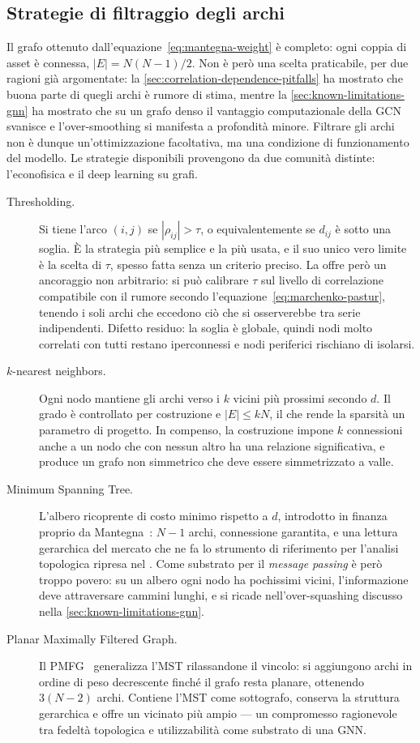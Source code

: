 \subsection{Strategie di filtraggio degli archi}

Il grafo ottenuto dall'equazione~\eqref{eq:mantegna-weight} è completo: ogni coppia di asset è connessa, $|E| = N(N-1)/2$. Non è però una scelta praticabile, per due ragioni già argomentate: la \cref{sec:correlation-dependence-pitfalls} ha mostrato che buona parte di quegli archi è rumore di stima, mentre la \cref{sec:known-limitations-gnn} ha mostrato che su un grafo denso il vantaggio computazionale della GCN svanisce e l'over-smoothing si manifesta a profondità minore. Filtrare gli archi non è dunque un'ottimizzazione facoltativa, ma una condizione di funzionamento del modello. Le strategie disponibili provengono da due comunità distinte: l'econofisica e il deep learning su grafi.

\begin{description}
    \item[Thresholding.] Si tiene l'arco $(i,j)$ se $|\rho_{ij}|>\tau$, o equivalentemente se $d_{ij}$ è sotto una soglia. È la strategia più semplice e la più usata, e il suo unico vero limite è la scelta di $\tau$, spesso fatta senza un criterio preciso. La  offre però un ancoraggio non arbitrario: si può calibrare $\tau$ sul livello di correlazione compatibile con il rumore secondo l'equazione~\eqref{eq:marchenko-pastur}, tenendo i soli archi che eccedono ciò che si osserverebbe tra serie indipendenti. Difetto residuo: la soglia è globale, quindi nodi molto correlati con tutti restano iperconnessi e nodi periferici rischiano di isolarsi.
    \item[$k$-nearest neighbors.] Ogni nodo mantiene gli archi verso i $k$ vicini più prossimi secondo $d$. Il grado è controllato per costruzione e $|E|\leq kN$, il che rende la sparsità un parametro di progetto. In compenso, la costruzione impone $k$ connessioni anche a un nodo che con nessun altro ha una relazione significativa, e produce un grafo non simmetrico che deve essere simmetrizzato a valle.
    \item[Minimum Spanning Tree.] L'albero ricoprente di costo minimo rispetto a $d$, introdotto in finanza proprio da Mantegna~\cite{mantegna1999hierarchical}: $N-1$ archi, connessione garantita, e una lettura gerarchica del mercato che ne fa lo strumento di riferimento per l'analisi topologica ripresa nel . Come substrato per il \emph{message passing} è però troppo povero: su un albero ogni nodo ha pochissimi vicini, l'informazione deve attraversare cammini lunghi, e si ricade nell'over-squashing discusso nella \cref{sec:known-limitations-gnn}.
    \item[Planar Maximally Filtered Graph.] Il PMFG~\cite{tumminello2005tool} generalizza l'MST rilassandone il vincolo: si aggiungono archi in ordine di peso decrescente finché il grafo resta planare, ottenendo $3(N-2)$ archi. Contiene l'MST come sottografo, conserva la struttura gerarchica e offre un vicinato più ampio — un compromesso ragionevole tra fedeltà topologica e utilizzabilità come substrato di una GNN.
\end{description}

